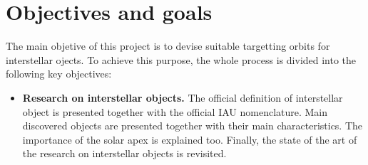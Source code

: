 \section{Objectives and goals}

The main objetive of this project is to devise suitable targetting orbits for
interstellar ojects. To achieve this purpose, the whole process is divided
into the following key objectives:

\begin{itemize}
    \item \textbf{Research on interstellar objects.}
        The official definition of interstellar object is presented together
        with the official IAU nomenclature. Main discovered objects are
        presented together with their main characteristics. The importance of
        the solar apex is explained too. Finally, the state of the art of the
        research on interstellar objects is revisited.
\end{itemize}
